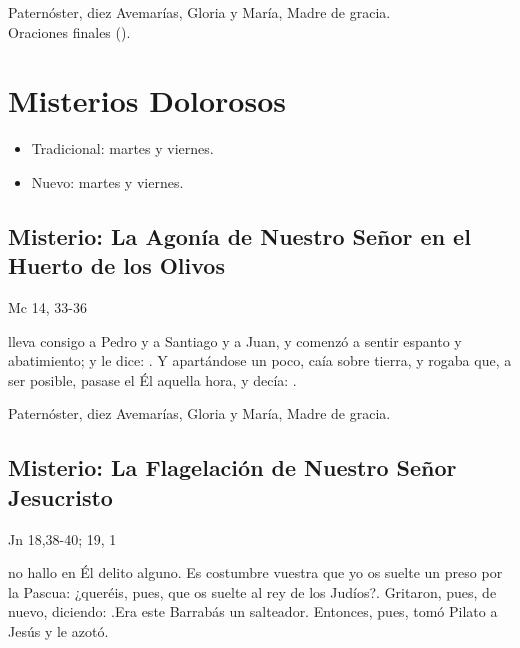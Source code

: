 \documentclass[./main.tex]{subfiles}
\newcounter{sorrowful-counter}
\begin{document}
\begin{center}
      Paternóster, diez Avemarías, Gloria y María, Madre de gracia.\\
      Oraciones finales ().
\end{center}

\section*{Misterios Dolorosos}
\begin{itemize}
      \item Tradicional: martes y viernes.
      \item Nuevo: martes y viernes.
\end{itemize}

\subsection*{ Misterio: La Agonía de Nuestro Señor en el Huerto de los Olivos}
\begin{flushright}
      {\color{red}Mc 14, 33-36}
\end{flushright}
 lleva consigo a Pedro y a Santiago y a Juan, y comenzó a sentir espanto y abatimiento; y le dice: . Y apartándose un poco, caía sobre tierra, y rogaba que, a ser posible, pasase el Él aquella hora, y decía: .

\begin{center}
      Paternóster, diez Avemarías, Gloria y María, Madre de gracia.
\end{center}

\subsection*{ Misterio: La Flagelación de Nuestro Señor Jesucristo}
\begin{flushright}
      {\color{red}Jn 18,38-40; 19, 1}
\end{flushright}
 no hallo en Él delito alguno. Es costumbre vuestra que yo os suelte un preso por la Pascua: ¿queréis, pues, que os suelte al rey de los Judíos?{\guillemotright}. 
Gritaron, pues, de nuevo, diciendo: .Era este Barrabás un salteador. Entonces, pues, tomó Pilato a Jesús y le azotó.
\end{document}
